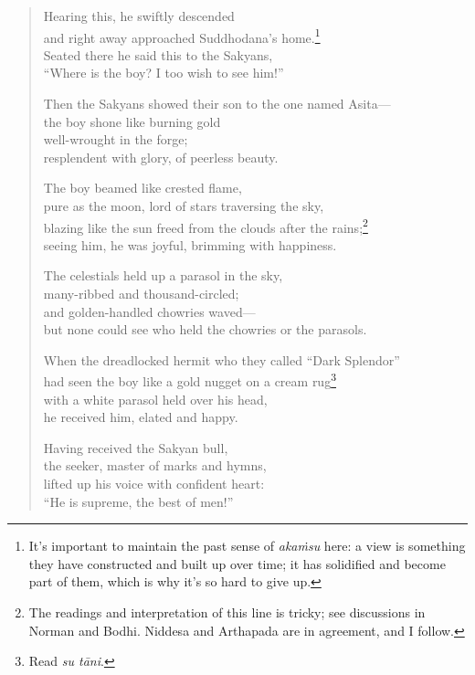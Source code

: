 \documentclass[12pt,openany]{book}%
\begin{document}
\begin{verse}
Hearing this, he swiftly descended \\
and right away approached Suddhodana’s home.\footnote{It’s important to maintain the past sense of \textit{\textsanskrit{akaṁsu}} here: a view is something they have constructed and built up over time; it has solidified and become part of them, which is why it’s so hard to give up. } \\
Seated there he said this to the Sakyans, \\
“Where is the boy? I too wish to see him!” 

Then the Sakyans showed their son to the one named Asita—\\
the boy shone like burning gold \\
well-wrought in the forge; \\
resplendent with glory, of peerless beauty. 

The boy beamed like crested flame, \\
pure as the moon, lord of stars traversing the sky, \\
blazing like the sun freed from the clouds after the rains;\footnote{The readings and interpretation of this line is tricky; see discussions in Norman and Bodhi. Niddesa and Arthapada are in agreement, and I follow. } \\
seeing him, he was joyful, brimming with happiness. 

The celestials held up a parasol in the sky, \\
many-ribbed and thousand-circled; \\
and golden-handled chowries waved—\\
but none could see who held the chowries or the parasols. 

When the dreadlocked hermit who they called “Dark Splendor” \\
had seen the boy like a gold nugget on a cream rug\footnote{Read \textit{su \textsanskrit{tāni}}. } \\
with a white parasol held over his head, \\
he received him, elated and happy. 

Having received the Sakyan bull, \\
the seeker, master of marks and hymns, \\
lifted up his voice with confident heart: \\
“He is supreme, the best of men!” 


\end{verse}
\end{document}
